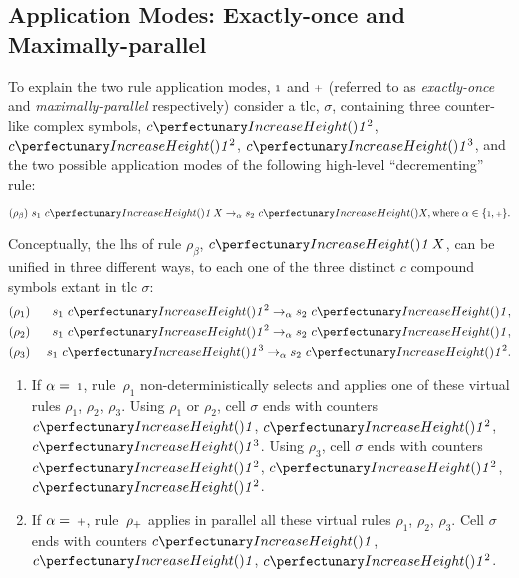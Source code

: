 \subsection{\label{sec:cps:applicationmodes}Application Modes: Exactly-once and Maximally-parallel}
To explain the two rule application modes, \({\scriptstyle 1}\) and \({\scriptstyle +}\) (referred to as \emph{exactly-once} and \emph{maximally-parallel} respectively) consider a \gls{tlc}, \(\sigma\), containing three counter-like complex symbols,
\(\cpfunc{c}{\cpundig^2}\), \(\cpfunc{c}{\cpundig^2}\), \(\cpfunc{c}{\cpundig^3}\),
and the two possible application modes of the following high-level ``decrementing'' rule:
\vspace{-0.2cm}
\begin{framed}
\vspace{-0.5cm}
\[(\rho_\beta) ~s_1 ~\cpfunc{c}{\cpundig \, X} \rightarrow_{\alpha} s_2 ~\cpfunc{c}{X},\\
\mathrm{where} \; \alpha \in \{\cponce, \cpmaxpar\}.\]
\vspace{-0.8cm}
\end{framed}

Conceptually, the \gls{lhs} of rule \(\rho_\beta\), \(\cpfunc{c}{\cpundig \, X}\), can be unified in three different ways,
to each one of the three distinct \(c\) compound symbols extant in \gls{tlc} \(\sigma\):
\begin{eqnarray*}
& (\rho_1)  & ~s_1 ~\cpfunc{c}{\cpundig^2} \rightarrow_{\alpha} s_2 ~\cpfunc{c}{\cpundig},\\
& (\rho_2)  & ~s_1 ~\cpfunc{c}{\cpundig^2} \rightarrow_{\alpha} s_2 ~\cpfunc{c}{\cpundig},\\
& (\rho_3) & ~s_1 ~\cpfunc{c}{\cpundig^3} \rightarrow_{\alpha} s_2 ~\cpfunc{c}{\cpundig^2}.
\end{eqnarray*}

\begin{enumerate}
\item If \(\alpha = \: {\scriptstyle 1}\), rule~\(\rho_1\) 
non-deterministically selects and applies one of these virtual rules \(\rho_1\), \(\rho_2\), \(\rho_3\).
Using \(\rho_1\) or \(\rho_2\), 
cell \(\sigma\) ends with counters \(\cpfunc{c}{\cpundig}\), \(\cpfunc{c}{\cpundig^2}\), \(\cpfunc{c}{\cpundig^3}\).
Using \(\rho_3\),
cell \(\sigma\) ends with counters \(\cpfunc{c}{\cpundig^2}\), \(\cpfunc{c}{\cpundig^2}\), \(\cpfunc{c}{\cpundig^2}\).

\smallskip
\item If \(\alpha = \: {\scriptstyle +}\), rule~\(\rho_{\scriptstyle +}\) 
applies in parallel all these virtual rules \(\rho_1\), \(\rho_2\), \(\rho_3\).
Cell \(\sigma\) ends with counters \(\cpfunc{c}{\cpundig}\), \(\cpfunc{c}{\cpundig}\), \(\cpfunc{c}{\cpundig^2}\).
\end{enumerate}

